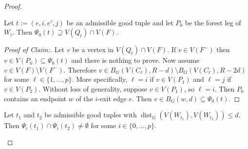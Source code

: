 \documentclass{patmorin}
\newenvironment{clmproof}{\begin{proof}[Proof of Claim:]\renewcommand{\qedsymbol}{\rule{1ex}{1ex}}}{\end{proof}}
\DeclareMathOperator{\dist}{dist}
\begin{document}
\begin{proof}
%
%

\begin{clm}\label{overlap}
  Let $t:=(e,i,e',j)$ be an admissible good tuple and let $P_0$ be the forest leg of $W_t$.  Then $\Psi_0(t)\supseteq V(Q_t)\cap V(F)$.
\end{clm}

\begin{clmproof}
  Let $v$ be a vertex in $V(Q_t)\cap V(F)$.  If $v\in V(F^-)$ then $v\in V(P_0)\subseteq\Psi_0(t)$ and there is nothing to prove.  Now assume $v\in V(F)\setminus V(F^-)$. Therefore $v\in B_G(V(C_\ell),R-d)\setminus B_G(V(C_\ell),R-2d)$ for some $\ell\in\{1,\ldots,p\}$.  More specifically, $\ell=i$ if $v\in V(P_1)$ and $\ell=j$ if $v\in V(P_2)$. Without loss of generality, suppose $v\in V(P_1)$, so $\ell=i$. Then $P_0$ contains an endpoint $w$ of the $i$-exit edge $e$. Then $v\in B_G(w,d)\subseteq\Psi_0(t)$.
\end{clmproof}

\begin{clm}\label{w_distance}
  Let $t_1$ and $t_2$ be admissible good tuples with $\dist_G(V(W_{t_1}),V(W_{t_2}))\le d$.  Then $\Psi_i(t_1)\cap \Psi_i(t_2)\neq\emptyset$ for some $i\in\{0,\ldots,p\}$.
\end{clm}



\end{proof}
\end{document}
